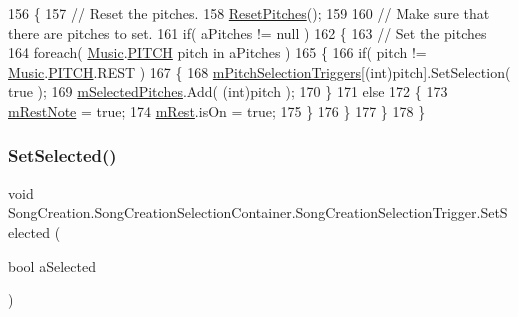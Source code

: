 \begin{DoxyCode}
156         \{
157             \textcolor{comment}{// Reset the pitches.}
158             \hyperlink{group___s_c_handlers_ga9dc0b40102f1fb0e50fdf07ca7b31d96}{ResetPitches}();
159 
160             \textcolor{comment}{// Make sure that there are pitches to set.}
161             \textcolor{keywordflow}{if}( aPitches != null )
162             \{
163                 \textcolor{comment}{// Set the pitches}
164                 \textcolor{keywordflow}{foreach}( \hyperlink{class_music}{Music}.\hyperlink{group___music_enums_ga508f69b199ea518f935486c990edac1d}{PITCH} pitch in aPitches )
165                 \{
166                     \textcolor{keywordflow}{if}( pitch != \hyperlink{class_music}{Music}.\hyperlink{group___music_enums_ga508f69b199ea518f935486c990edac1d}{PITCH}.REST )
167                     \{
168                         \hyperlink{group___s_c_handlers_ga1affedf973b4aa39505b35053c12df7e}{mPitchSelectionTriggers}[(int)pitch].SetSelection( \textcolor{keyword}{true} );
169                         \hyperlink{group___s_c_handlers_ga816236cbae1f13ea34be94fb1b86b7cd}{mSelectedPitches}.Add( (\textcolor{keywordtype}{int})pitch );
170                     \}
171                     \textcolor{keywordflow}{else}
172                     \{
173                         \hyperlink{group___s_c_handlers_gace289a908db9ba443c50ec8656ae05b1}{mRestNote} = \textcolor{keyword}{true};
174                         \hyperlink{group___s_c_handlers_ga41e99d322cb92a3eb304bef704af2b7a}{mRest}.isOn = \textcolor{keyword}{true};
175                     \}
176                 \}
177             \}
178         \}
\end{DoxyCode}
\mbox{\label{group___s_c_handlers_ga477673c43fb3b828ed54d06d00e93f08}} 
\subsubsection{\texorpdfstring{Set\+Selected()}{SetSelected()}\hspace{0.1cm}{\footnotesize\ttfamily [1/2]}}
{\footnotesize\ttfamily void Song\+Creation.\+Song\+Creation\+Selection\+Container.\+Song\+Creation\+Selection\+Trigger.\+Set\+Selected (\begin{DoxyParamCaption}\item[{bool}]{a\+Selected }\end{DoxyParamCaption})}



